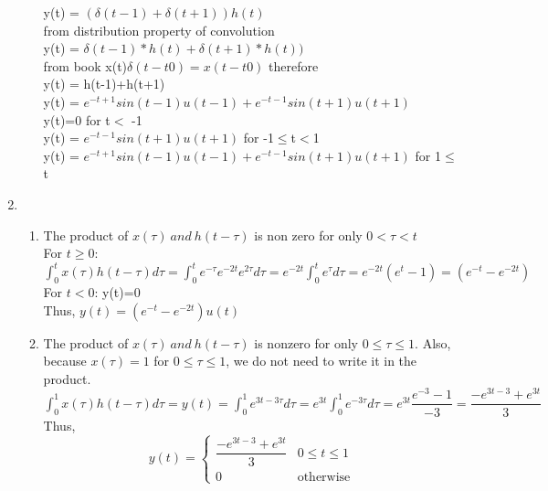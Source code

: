 \documentclass[10pt,a4paper, margin=1in]{article}
\begin{document}
\begin{enumerate}
\begin{enumerate}
   
    y(t) = $ (\delta (t-1)+ \delta (t+1))h(t) $ \\
    from distribution property of convolution \\
     y(t) = $ \delta (t-1)*h(t) + \delta (t+1)*h(t)) $ \\
    from book x(t)$\delta (t-t0) = x(t-t0)$ therefore \\
    y(t) = h(t-1)+h(t+1) \\
    y(t) = $e^{-t+1}sin(t-1)u(t-1)+e^{-t-1}sin(t+1)u(t+1) $ \\
    y(t)=0 for t$<$ -1 \\
    y(t) = $e^{-t-1}sin(t+1)u(t+1) $ for -1$\leq$t$<$1 \\
    y(t) = $e^{-t+1}sin(t-1)u(t-1)+e^{-t-1}sin(t+1)u(t+1) $ for 1$\leq$t
     
    	 
    \end{enumerate}

\item %
    \begin{enumerate}
    \item %
    The product of $x(\tau)\ and\ h(t-\tau)$ is non zero for only $0<\tau<t$ \\
    For $t\geq0$:
    $\int_{0}^{t}x(\tau)h(t-\tau)d\tau=\int_{0}^{t}e^{-\tau}e^{-2t}e^{2\tau}d\tau=e^{-2t}\int_{0}^{t}e^{\tau}d\tau=e^{-2t}(e^t-1)=(e^{-t}-e^{-2t})$\\
    For $t<0$: y(t)=0\\
    Thus, $y(t)=(e^{-t}-e^{-2t})u(t)$
    \item %
    The product of $x(\tau)\ and\ h(t-\tau)$ is nonzero for only $0\leq\tau\leq1$. Also,  because $x(\tau)=1$ for $0\leq\tau\leq1$, we do not need to write it in the product.\\
    $\int_{0}^{1}x(\tau)h(t-\tau)d\tau=y(t)=\int_{0}^{1}e^{3t-3\tau}d\tau=e^{3t}\int_{0}^{1}e^{-3\tau}d\tau=e^{3t}\dfrac{e^{-3}-1}{-3}=\dfrac{-e^{3t-3}+e^{3t}}{3}$\\
    Thus, \begin{equation}
   y(t)=%
   \begin{cases}
     \dfrac{-e^{3t-3}+e^{3t}}{3} & 0\leq t\leq1 \\
     0 &\text{otherwise}
   \end{cases}
\end{equation}
    \end{enumerate}


\end{enumerate}
\end{document}
